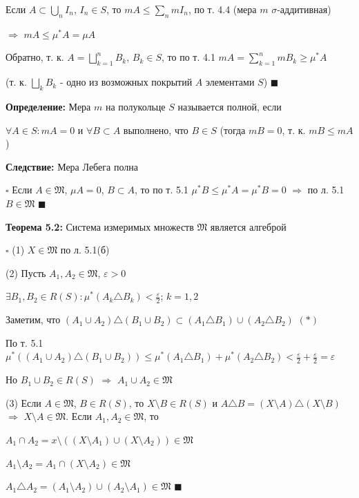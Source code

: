 \documentclass[a4paper]{report}
\begin{document}
Если $A\subset\bigcup\limits_n I_n$, $I_n\in S$, то $mA\le\sum\limits_n mI_n$, по т. 4.4 (мера $m$ $\sigma$-аддитивная)

$\Rightarrow$ $mA\le\mu^*A=\mu A$

Обратно, т. к. $A=\bigsqcup\limits_{k=1}^n B_k$, $B_k\in S$, то по т. 4.1 $mA=\sum\limits_{k=1}^n mB_k\ge\mu^*A$

(т. к. $\bigsqcup\limits_k B_k$ - одно из возможных покрытий $A$ элементами $S$) $\blacksquare$
\bigskip

\noindent\textbf{Определение:} Мера $m$ на полукольце $S$ называется полной, если

$\forall A\in S\colon mA=0$ и
$\forall B\subset A$ выполнено, что $B\in S$ (тогда $mB=0$, т. к. $mB\le mA$)
\bigskip

\noindent\textbf{Следствие:} Мера Лебега полна

\noindent $\square$ Если $A\in\mathfrak M$, $\mu A=0$, $B\subset A$, то по т. 5.1 $\mu^*B\le\mu^*A=\mu^*B=0$ $\Rightarrow$
по л. 5.1 $B\in\mathfrak M$ $\blacksquare$
 \bigskip

 \noindent\textbf{Теорема 5.2:} Система измеримых множеств $\mathfrak M$ является алгеброй

\noindent $\square$ (1) $X\in\mathfrak M$ по л. 5.1(б)

(2) Пусть $A_1,A_2\in\mathfrak M$, $\varepsilon>0$

$\exists B_1,B_2\in R(S)\colon\mu^*(A_k\triangle B_k)<\frac\varepsilon2$; $k=1,2$

Заметим, что $(A_1\cup A_2)\triangle(B_1\cup B_2)\subset(A_1\triangle B_1)\cup(A_2\triangle B_2)$ $(*)$

По т. 5.1 $\mu^*\left((A_1\cup A_2)\triangle(B_1\cup B_2)\right)\le\mu^*(A_1\triangle B_1)+\mu^*(A_2\triangle B_2)<\frac\varepsilon2
+\frac\varepsilon2=\varepsilon$

Но $B_1\cup B_2\in R(S)$ $\Rightarrow$ $A_1\cup A_2\in\mathfrak M$

(3) Если $A\in\mathfrak M$, $B\in R(S)$, то $X\setminus B\in R(S)$ и $A\triangle B=(X\setminus A)\triangle(X\setminus B)$
$\Rightarrow$ $X\setminus A\in\mathfrak M$. Если $A_1,A_2\in\mathfrak M$, то

$A_1\cap A_2=x\setminus\left((X\setminus A_1)\cup(X\setminus A_2)\right)\in\mathfrak M$

$A_1\setminus A_2=A_1\cap(X\setminus A_2)\in\mathfrak M$

$A_1\triangle A_2=(A_1\setminus A_2)\cup(A_2\setminus A_1)\in\mathfrak M$ $\blacksquare$
\bigskip
\end{document}
